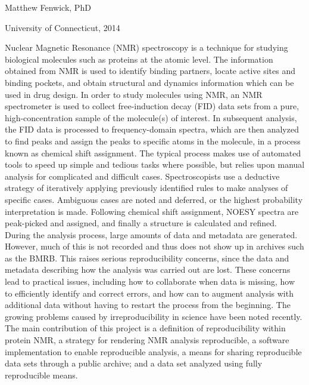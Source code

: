 \pagestyle{myabstract} %
\thispagestyle{empty} %

\begin{center}
  {\LARGE \mattftitle{}}
  
  \vspace{2cm}

  Matthew Fenwick, PhD
  
  \vspace{0.5cm}

  University of Connecticut, 2014
  
  \vspace{1in}
\end{center}

\thispagestyle{empty}
Nuclear Magnetic Resonance (NMR) spectroscopy is a technique for studying 
biological molecules such as proteins at the atomic level.  
The information obtained from NMR is used to identify 
binding partners, locate active sites and binding pockets, and obtain 
structural and dynamics information which can be used in drug design.  In 
order to study molecules using NMR, an NMR spectrometer is used to collect 
free-induction decay (FID) data sets from a pure, high-concentration sample 
of the molecule(s) of interest.  In subsequent analysis, the FID data is 
processed to frequency-domain spectra, which are then analyzed to find peaks 
and assign the peaks to specific atoms in the molecule, in a process known as 
chemical shift assignment.  The typical process makes use of automated tools to 
speed up simple and tedious tasks where possible, but relies upon manual 
analysis for complicated and difficult cases.  Spectroscopists use a deductive 
strategy of iteratively applying previously identified rules to make analyses 
of specific cases.  Ambiguous cases are noted and deferred, or the highest 
probability interpretation is made.  Following chemical shift assignment, 
NOESY spectra are peak-picked and assigned, and finally a structure is 
calculated and refined.  During the analysis process, large amounts of data 
and metadata are generated.  However, much of this is not recorded and thus 
does not show up in archives such as the BMRB.  This raises serious 
reproducibility concerns, since the data and metadata describing how the 
analysis was carried out are lost.  These concerns lead to practical issues,
including how to collaborate when data is missing, how to efficiently identify 
and correct errors, and how can to augment analysis with additional data  
without having to restart the process from the beginning.
The growing problems caused by irreproducibility in science have been noted 
recently.  The main contribution of this project is a definition of 
reproducibility within protein NMR, a strategy for rendering NMR analysis 
reproducible, a software implementation to enable reproducible analysis, a 
means for sharing reproducible data sets through a public archive; and a data 
set analyzed using fully reproducible means.

\clearpage
\pagestyle{plain}

